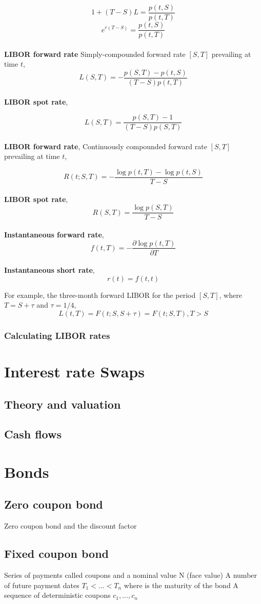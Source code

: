 \documentclass[11pt,a4paper]{article}
\numberwithin{equation}{section}
\begin{document}
\[ 
1+(T-S)L=\frac{p(t,S)}{p(t,T)}
\]
\[ 
e^{r(T-S)}=\frac{p(t,S)}{p(t,T)}
\]
\\
\textbf{LIBOR forward rate}
Simply-compounded forward rate $[S,T]$ prevailing at time $t$,
\[
L(S,T) = -\frac{p(S,T)-p(t,S)}{(T-S)p(t,T)}
\]
\\
\textbf{LIBOR spot rate},

\[
L(S,T)=\frac{p(S,T)-1}{(T-S)p(S,T)}
\]
\\
\textbf{LIBOR forward rate},
Continuously compounded forward rate $[S,T]$ prevailing at time $t$,

\[
R(t;S,T)=-\frac{\log{p(t,T)}-\log{p(t,S)}}{T-S}
\]
\\
\textbf{LIBOR spot rate},
\[
R(S,T)=\frac{\log{p(S,T)}}{T-S}
\]
\\
\textbf{Instantaneous forward rate},
\[
f(t,T)=-\frac{\partial\log{p(t,T)}}{\partial{T}}
\]
\\
\textbf{Instantaneous short rate},
\[
r(t)=f(t,t)
\]

For example, the three-month forward LIBOR for the period $[S,T]$, where $T=S+\tau$ and $\tau=1/4$,
\[
L(t,T) = F(t;S,S+\tau) = F(t;S,T), T>S
\]

\subsubsection{Calculating LIBOR rates}

\section{Interest rate Swaps}
\subsection{Theory and valuation}
\subsection{Cash flows}
\section{Bonds}
\label{sec:fi}

\subsection{Zero coupon bond}
Zero coupon bond and the discount factor

\subsection{Fixed coupon bond}
Series of payments called coupons and a nominal value N (face value)
A number of future payment dates $T_1 < ... < T_n$ where is the maturity of the bond
A sequence of deterministic coupons $c_1, ..., c_n$
\end{document}
